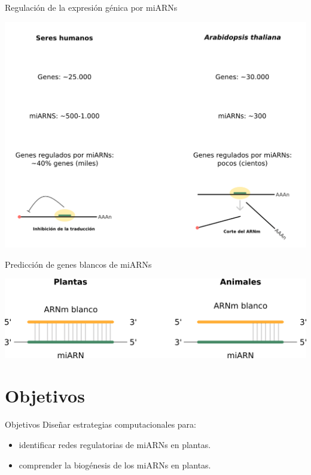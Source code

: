 \documentclass{beamer}
\begin{document}
\begin{frame}{Regulación de la expresión génica por miARNs}
        \begin{center}
            \includegraphics[width=1\textwidth]{img/exp_gen04.png}
        \end{center}
\end{frame}

\begin{frame}{Predicción de genes blancos de miARNs}
	\begin{center}
		\includegraphics[width=1\textwidth]{img/interaccion_miRNA_target.png}
	\end{center}
\end{frame}


\section{Objetivos}

\begin{frame}{Objetivos}
    Diseñar estrategias computacionales para:
	\begin{itemize}[<+->]
        \item identificar redes regulatorias de miARNs en plantas.
        \item comprender la biogénesis de los miARNs en plantas.
	\end{itemize}
\end{frame}
\end{document}
